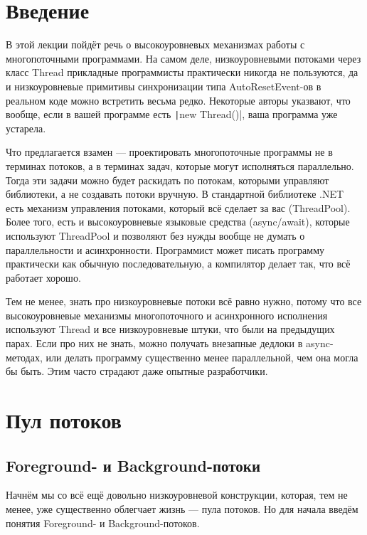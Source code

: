 \documentclass{../../text-style}
\begin{document}
\maketitle
\thispagestyle{empty}

\section{Введение}

В этой лекции пойдёт речь о высокоуровневых механизмах работы с многопоточными программами. На самом деле, низкоуровневыми потоками через класс Thread прикладные программисты практически никогда не пользуются, да и низкоуровневые примитивы синхронизации типа AutoResetEvent-ов в реальном коде можно встретить весьма редко. Некоторые авторы указвают, что вообще, если в вашей программе есть \texttt|new Thread()|, ваша программа уже устарела.

Что предлагается взамен --- проектировать многопоточные программы не в терминах потоков, а в терминах задач, которые могут исполняться параллельно. Тогда эти задачи можно будет раскидать по потокам, которыми управляют библиотеки, а не создавать потоки вручную. В стандартной библиотеке .NET есть механизм управления потоками, который всё сделает за вас (ThreadPool). Более того, есть и высокоуровневые языковые средства (async/await), которые используют ThreadPool и позволяют без нужды вообще не думать о параллельности и асинхронности. Программист может писать программу практически как обычную последовательную, а компилятор делает так, что всё работает хорошо.

Тем не менее, знать про низкоуровневые потоки всё равно нужно, потому что все высокоуровневые механизмы многопоточного и асинхронного исполнения используют Thread и все низкоуровневые штуки, что были на предыдущих парах. Если про них не знать, можно получать внезапные дедлоки в async-методах, или делать программу существенно менее параллельной, чем она могла бы быть. Этим часто страдают даже опытные разработчики.

\section{Пул потоков}

\subsection{Foreground- и Background-потоки}

Начнём мы со всё ещё довольно низкоуровневой конструкции, которая, тем не менее, уже существенно облегчает жизнь --- пула потоков. Но для начала введём понятия Foreground- и Background-потоков.
\end{document}
